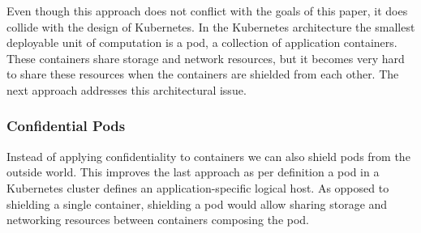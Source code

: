 Even though this approach does not conflict with the goals of this paper, it does
collide with the design of Kubernetes. In the Kubernetes architecture the
smallest deployable unit of computation is a pod, a collection of application
containers. These containers share storage and network resources, but it becomes
very hard to share these resources when the containers are shielded from each
other. The next approach addresses this architectural issue.

\subsubsection{Confidential Pods}
\label{sec:confidential-applications}

Instead of applying confidentiality to containers we can also shield pods from
the outside world. This improves the last approach as per definition a pod in a
Kubernetes cluster defines an application-specific logical host. As opposed to
shielding a single container, shielding a pod would allow sharing storage and
networking resources between containers composing the pod.

